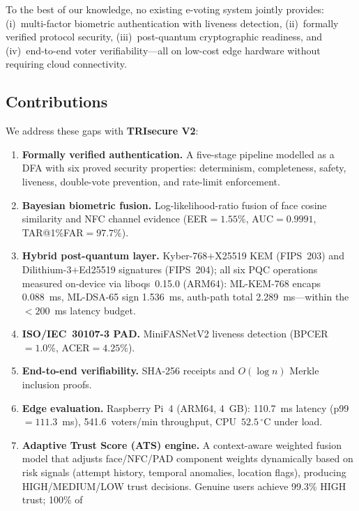 \documentclass[pdflatex,sn-vancouver-num]{sn-jnl}%
\theoremstyle{thmstyleone}%
\theoremstyle{thmstyletwo}%
\theoremstyle{thmstylethree}%
\begin{document}
To the best of our knowledge, no existing e-voting system jointly provides:
(i)~multi-factor biometric authentication with liveness detection,
(ii)~formally verified protocol security, (iii)~post-quantum cryptographic
readiness, and (iv)~end-to-end voter verifiability---all on low-cost edge
hardware without requiring cloud connectivity.

\subsection*{Contributions}

We address these gaps with \textbf{TRIsecure V2}:

\begin{enumerate}[label=\textbf{C\arabic*.},leftmargin=*]
  \item \textbf{Formally verified authentication.} A five-stage pipeline
        modelled as a DFA with six proved security properties: determinism,
        completeness, safety, liveness, double-vote prevention, and
        rate-limit enforcement.
  \item \textbf{Bayesian biometric fusion.} Log-likelihood-ratio fusion of
        face cosine similarity and NFC channel evidence
        (EER\(=1.55\%\), AUC\(=0.9991\), TAR@1\%FAR\(=97.7\%\)).
  \item \textbf{Hybrid post-quantum layer.} Kyber-768\(+\)X25519 KEM
        (FIPS~203) and Dilithium-3\(+\)Ed25519 signatures (FIPS~204); all
        six PQC operations measured on-device via liboqs~0.15.0 (ARM64):
        ML-KEM-768 encaps 0.088~ms, ML-DSA-65 sign 1.536~ms, auth-path
        total 2.289~ms---within the \(<200\)~ms latency budget.
  \item \textbf{ISO/IEC~30107-3 PAD.} MiniFASNetV2 liveness detection
        (BPCER\(=1.0\%\), ACER\(=4.25\%\)).
  \item \textbf{End-to-end verifiability.} SHA-256 receipts and \(O(\log n)\)
        Merkle inclusion proofs.
  \item \textbf{Edge evaluation.} Raspberry Pi~4 (ARM64, 4~GB): 110.7~ms
        latency (p99\(=111.3\)~ms), 541.6~voters/min throughput,
        CPU~\(52.5\,^\circ\)C under load.
  \item \textbf{Adaptive Trust Score (ATS) engine.} A context-aware
        weighted fusion model that adjusts face/NFC/PAD component weights
        dynamically based on risk signals (attempt history, temporal
        anomalies, location flags), producing HIGH/MEDIUM/LOW trust
        decisions. Genuine users achieve 99.3\% HIGH trust; 100\% of

\end{enumerate}
\end{document}
